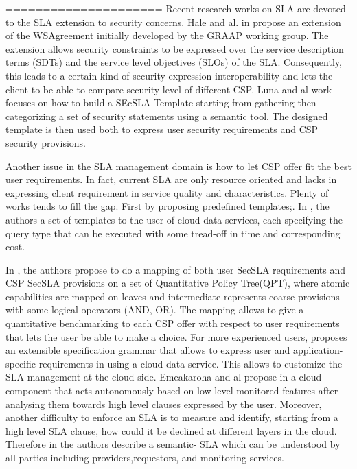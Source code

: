 =====================
Recent research works on SLA are devoted to the SLA extension to security concerns. Hale
and al. in \cite{6274042} propose an extension of the WSAgreement initially developed by the GRAAP
working group. The extension allows security constraints to be expressed over the service description
terms (SDTs) and the service level objectives (SLOs) of the SLA. Consequently, this leads to a certain kind of security expression interoperability and lets the client to be able to compare security level of different CSP. Luna and al
work \cite{LunaGarcia:2012:BCS:2381913.2381932} focuses on how to build a SEcSLA Template starting from gathering then categorizing a set of security statements using a semantic tool. The designed template is then used both to express user security requirements and CSP security provisions.

Another issue in the SLA management domain is how to let CSP offer fit the best user requirements. In fact, current SLA are only resource oriented and lacks in expressing client requirement in service quality and characteristics. Plenty of works tends to fill the gap. First by proposing predefined templates;. In \cite{Ortiz:2013:VPS:2486767.2486772}, the authors
  a set of templates to the user of cloud data services, each specifying the query type that can be executed with some tread-off in time and corresponding cost. 
  
  In \cite{LunaGarcia:2012:BCS:2381913.2381932,}, the authors propose to do a mapping of both user SecSLA requirements and CSP SecSLA provisions on a set of Quantitative Policy Tree(QPT), where atomic capabilities are mapped on leaves and intermediate represents coarse provisions with some logical operators (AND, OR). The mapping allows to give a quantitative benchmarking to each CSP offer with respect to user requirements that lets the user be able to make a choice. For more experienced users, \cite{6313668} proposes an extensible specification grammar that allows to express user and application-specific requirements in using a cloud data service. This allows to customize the SLA management at the cloud side. Emeakaroha and al propose in \cite{5547150}  a cloud component that acts autonomously based on low level monitored features after analysing them towards high level clauses expressed by the user. Moreover, another difficulty to enforce an SLA is to measure and identify, starting from a high level SLA clause, how could it be declined at different layers in the cloud. Therefore in  \cite{Dastjerdi:2012:DOA:2275356.2275360}  the authors describe a semantic- SLA which can be understood by all parties including providers,requestors, and monitoring services. 
  
